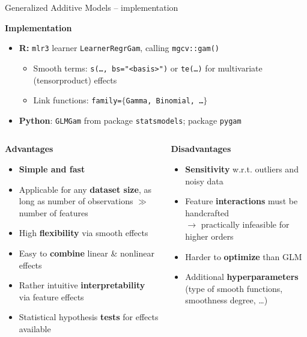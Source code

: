 \documentclass[11pt,compress,t,notes=noshow, xcolor=table]{beamer}
\newcommand{\highlight}[1]{\textcolor{hlcol}{\textbf{#1}}}
\newcommand{\positem}{\item[\textcolor{hlcol}{$\bm{+}$}]}
\newcommand{\negitem}{\item[\textcolor{hlcol}{$\bm{-}$}]}
\begin{document}
\begin{frame2}{Generalized Additive Models -- implementation}

  \highlight{Implementation}

\begin{itemize}
  \item \textbf{R:} \texttt{mlr3} learner \texttt{LearnerRegrGam},
    calling \texttt{mgcv::gam()}
  \begin{itemize}
      \item Smooth terms: \texttt{s(\dots, bs="<basis>")} or \texttt{te(\dots)}
      for multivariate (tensorproduct) effects
      \item Link functions: \texttt{family=$\{$Gamma, Binomial, \dots $\}$}
  \end{itemize}
    \item \textbf{Python}: \texttt{GLMGam} from package \texttt{statsmodels};
    package \texttt{pygam}
\end{itemize}

\medskip

\framebreak

\begin{columns}[onlytextwidth]
  \begin{column}{0.5\textwidth}
    \highlight{Advantages}

    \begin{itemize}
      \positem \textbf{Simple and fast}
      \positem Applicable for any \textbf{dataset size}, as long as number of
      observations $\gg$ number of features
      \positem High \textbf{flexibility} via smooth effects
      \positem Easy to \textbf{combine} linear \& nonlinear effects
      \positem Rather intuitive \textbf{interpretability} via feature effects
      \positem Statistical hypothesis \textbf{tests} for effects available
    \end{itemize}
  \end{column}

  \begin{column}{0.5\textwidth}
    \highlight{Disadvantages}

    \begin{itemize}
      \negitem \textbf{Sensitivity} w.r.t. outliers and noisy data
      \negitem Feature \textbf{interactions} must be handcrafted\\
      $\rightarrow$ practically infeasible for higher orders
      \negitem Harder to \textbf{optimize} than GLM
      \negitem Additional \textbf{hyperparameters} (type of smooth functions,
      smoothness degree, \dots)
    \end{itemize}
  \end{column}
\end{columns}
  
\end{frame2}
\end{document}
